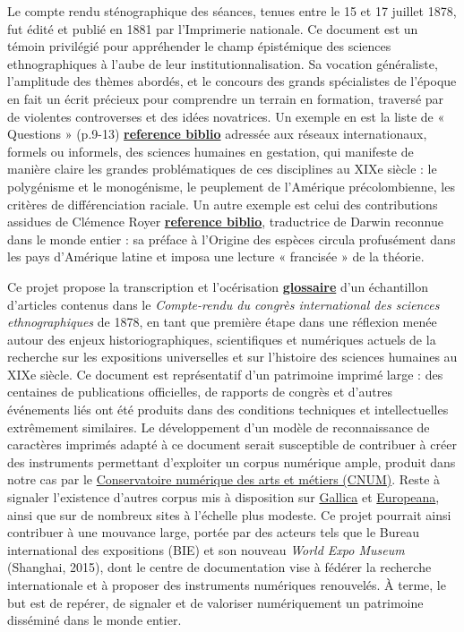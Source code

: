 \documentclass{article}
\begin{document}
	Le compte rendu sténographique des séances, tenues entre le 15 et 17 juillet 1878, fut édité et publié en 1881 par l’Imprimerie nationale. Ce document est un témoin privilégié pour appréhender le champ épistémique des sciences ethnographiques à l’aube de leur institutionnalisation. Sa vocation généraliste, l’amplitude des thèmes abordés, et le concours des grands spécialistes de l’époque en fait un écrit précieux pour comprendre un terrain en formation, traversé par de violentes controverses et des idées novatrices. Un exemple en est la liste de « Questions » (p.9-13) \underline{\textbf{reference biblio}} adressée aux réseaux internationaux, formels ou informels, des sciences humaines en gestation, qui manifeste de manière claire les grandes problématiques de ces disciplines au XIXe siècle : le polygénisme et le monogénisme, le peuplement de l’Amérique précolombienne, les critères de différenciation raciale. Un autre exemple est celui des contributions assidues de Clémence Royer \underline{\textbf{reference biblio}}, traductrice de Darwin reconnue dans le monde entier : sa préface à l’Origine des espèces circula profusément dans les pays d’Amérique latine et imposa une lecture « francisée » de la théorie. 
	
	Ce projet propose la transcription et l'océrisation \textbf{\underline{glossaire}} d’un échantillon d’articles contenus dans le \textit{Compte-rendu du congrès international des sciences ethnographiques} de 1878, en tant que première étape dans une réflexion menée autour des enjeux historiographiques, scientifiques et numériques actuels de la recherche sur les expositions universelles et sur l’histoire des sciences humaines au XIXe siècle. Ce document est représentatif d’un patrimoine imprimé large : des centaines de publications officielles, de rapports de congrès et d’autres événements liés ont été produits dans des conditions techniques et intellectuelles extrêmement similaires. Le développement d’un modèle de reconnaissance de caractères imprimés adapté à ce document serait susceptible de contribuer à créer des instruments permettant d’exploiter un corpus numérique ample, produit dans notre cas par le \href{http://cnum.cnam.fr/thematiques/fr/1.expositions\_universelles/cata\_auteurs.php}{Conservatoire numérique des arts et métiers (CNUM)}. Reste à signaler l’existence d’autres corpus mis à disposition sur \href{https://gallica.bnf.fr/accueil/es/content/accueil-es?mode=desktop}{Gallica} et \href{https://www.europeana.eu/fr}{Europeana}, ainsi que sur de nombreux sites à l'échelle plus modeste. Ce projet pourrait ainsi contribuer à une mouvance large, portée par des acteurs tels que le Bureau international des expositions (BIE) et son nouveau \textit{World Expo Museum} (Shanghai, 2015), dont le centre de documentation vise à fédérer la recherche internationale et à proposer des instruments numériques renouvelés. À terme, le but est de repérer, de signaler et de valoriser numériquement un patrimoine disséminé dans le monde entier. 
	
\end{document}

